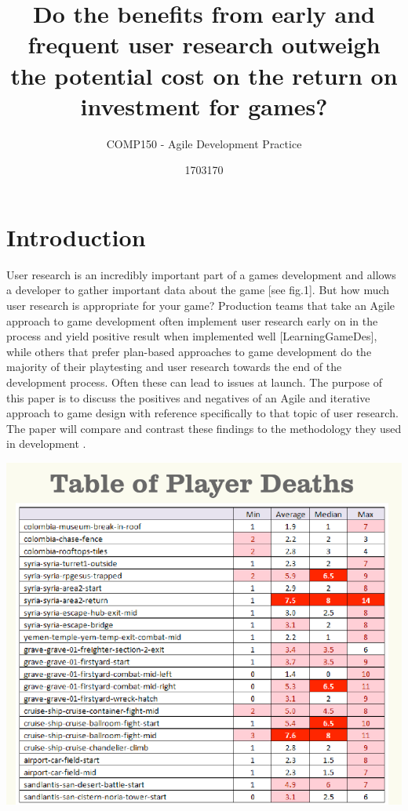 \documentclass{scrartcl}
\title{Do the benefits from early and frequent user research outweigh the potential cost on the return on investment for games?
}
\subtitle{COMP150 - Agile Development Practice}
\author{1703170}
\begin{document}
\maketitle


\section{Introduction}

User research is an incredibly important part of a games development and allows a developer to gather important data about the game [see fig.1]. But how much user research is appropriate for your game? Production teams that take an Agile approach \cite{fowler2001agile:1} to game development often implement user research early on in the process and yield positive result when implemented well [LearningGameDes], while others that prefer plan-based approaches to game development do the majority of their playtesting and user research towards the end of the development process. Often these can lead to issues at launch. The purpose of this paper is to discuss the positives and negatives of an Agile and iterative approach to game design with reference specifically to that topic of user research. The paper will compare and contrast these findings to the methodology they used in development \cite{politowski2016old,}.

\begin{center}
\includegraphics[scale=0.4]{PlayerDeathTable.png}
\end{center}
\end{document}
